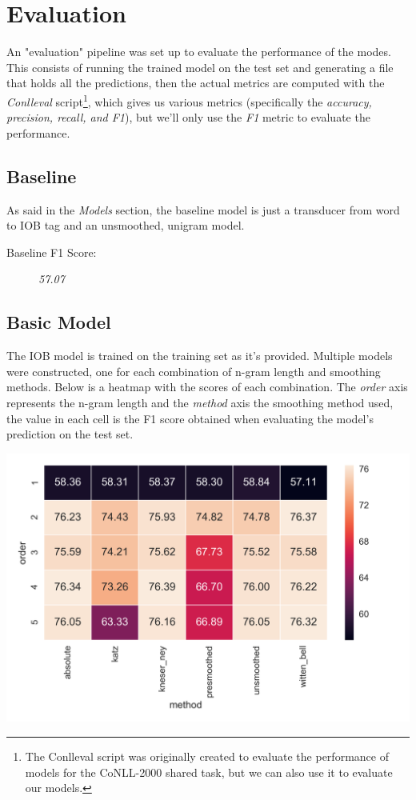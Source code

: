 \documentclass[11pt,a4paper]{article}
\begin{document}
\section{Evaluation}
	
	An "evaluation" pipeline was set up to evaluate the performance of the modes. This consists of running the trained model on the test set and generating a file that holds all the predictions, then the actual metrics are computed with the \textit{Conlleval} script\footnote{The Conlleval script was originally created to evaluate the performance of models for the CoNLL-2000 shared task, but we can also use it to evaluate our models.}, which gives us various metrics (specifically the \textit{accuracy, precision, recall, and F1}), but we'll only use the \textit{F1} metric to evaluate the performance.

\subsection{Baseline}

	As said in the \textit{Models} section, the baseline model is just a transducer from word to IOB tag and an unsmoothed, unigram model.
	
	\begin{description}
		\item[Baseline F1 Score:] \textit{57.07}
	\end{description}
	
\subsection{Basic Model}
	
	The IOB model is trained on the training set as it's provided. Multiple models were constructed, one for each combination of n-gram length and smoothing methods. Below is a heatmap with the scores of each combination. The \textit{order} axis represents the n-gram length and the \textit{method} axis the smoothing method used, the value in each cell is the F1 score obtained when evaluating the model's prediction on the test set.
	
	\hspace*{-1cm}\includegraphics[scale=0.6]{scores_heatmap_w2iob}
	
\end{document}
